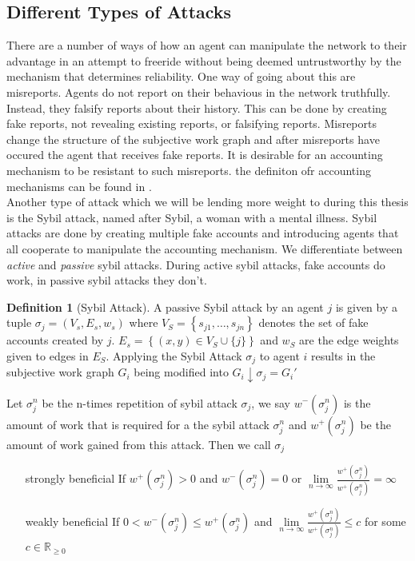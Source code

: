 \documentclass[11pt,a4paper]{article}
\theoremstyle{definition}
\newtheorem{definition}{Definition}[section]
\theoremstyle{theorem}
\theoremstyle{proposition}
\theoremstyle{corollary}
\theoremstyle{lemma}
\theoremstyle{example}
\theoremstyle{remark}
\begin{document}
\subsection{Different Types of Attacks}
\label{subsec:Different Types of Attacks}
There are a number of ways of how an agent can manipulate the network to their advantage in an attempt to freeride without being deemed untrustworthy by the mechanism that determines reliability. One way of going about this are misreports. Agents do not report on their behavious in the network truthfully. Instead, they falsify reports about their history. This can be done by creating fake reports, not revealing existing reports, or falsifying reports. Misreports change the structure of the subjective work graph and after misreports have occured the agent that receives fake reports. It is desirable for an accounting mechanism to be resistant to such misreports. the definiton ofr accounting mechanisms can be found in \cite{On the Sybil-Proofness of Accounting Mechanisms}. \vspace{1em}\\

\noindent Another type of attack which we will be lending more weight to during this thesis is the Sybil attack, named after Sybil, a woman with a mental illness. Sybil attacks are done by creating multiple fake accounts and introducing agents that all cooperate to manipulate the accounting mechanism. We differentiate between {\it active} and {\it passive} sybil attacks. During active sybil attacks, fake accounts do work, in passive sybil attacks they don't. 

\begin{definition}[Sybil Attack]
A passive Sybil attack by an agent $j$ is given by a tuple $\sigma_j=(V_s,E_s,w_s)$ where $V_S=\left\lbrace{}s_{j1},\ldots,s_{jn}\right\rbrace$ denotes the set of fake accounts created by $j$. $E_s=\left\lbrace{}(x,y)\in{}V_S\cup{}\{j\}\right\rbrace$ and $w_S$ are the edge weights given to edges in $E_S$. Applying the Sybil Attack $\sigma_j$ to agent $i$ results in the subjective work graph $G_i$ being modified into $G_i\downarrow{}\sigma_j=G_i'$
\end{definition}

Let $\sigma_j^n$ be the n-times repetition of sybil attack $\sigma_j$, we say $w^{-}(\sigma_j^n)$ is the amount of work that is required for a the sybil attack $\sigma_j^n$ and $w^{+}(\sigma_j^n)$ be the amount of work gained from this attack. Then we call $\sigma_j$ 
\begin{itemize}
\item[strongly beneficial] If $w^{+}(\sigma_j^n)>0$ and $w^{-}(\sigma_j^n)=0$ or $\lim\limits_{n\rightarrow\infty}\frac{w^{+}(\sigma_j^n)}{w^{+}(\sigma_j^n)}=\infty$
\item[weakly beneficial] If $0<w^{-}(\sigma_j^n)\leq{}w^{+}(\sigma_j^n)$ and $\lim\limits_{n\rightarrow\infty}\frac{w^{+}(\sigma_j^n)}{w^{+}(\sigma_j^n)}\leq{}c$ for some $c\in\mathbb{R}_{\geq{}0}$
\end{itemize}
\end{document}
